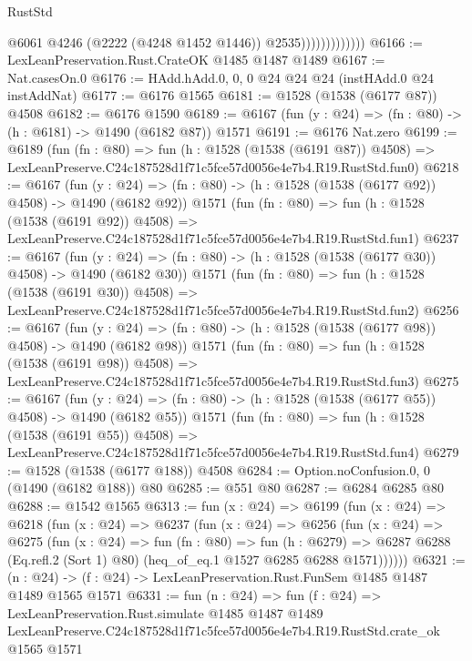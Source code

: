 \begin{lexlean}{RustStd}
\begin{coremodule}
                              @6061
                              @4246
                              (@2222 (@4248 @1452 @1446))
                              @2535)))))))))))))
@6166 := LexLeanPreservation.Rust.CrateOK @1485 @1487 @1489
@6167 := Nat.casesOn.{0}
@6176 := HAdd.hAdd.{0, 0, 0} @24 @24 @24 (instHAdd.{0} @24 instAddNat)
@6177 := @6176 @1565
@6181 := @1528 (@1538 (@6177 @87)) @4508
@6182 := @6176 @1590
@6189 := @6167 (fun (y : @24) => (fn : @80) -> (h : @6181) -> @1490 (@6182 @87)) @1571
@6191 := @6176 Nat.zero
@6199 := @6189
    (fun (fn : @80) =>
    fun (h : @1528 (@1538 (@6191 @87)) @4508) =>
    LexLeanPreserve.C24c187528d1f71c5fce57d0056e4e7b4.R19.RustStd.fun0)
@6218 := @6167
    (fun (y : @24) => (fn : @80) -> (h : @1528 (@1538 (@6177 @92)) @4508) -> @1490 (@6182 @92))
    @1571
    (fun (fn : @80) =>
    fun (h : @1528 (@1538 (@6191 @92)) @4508) =>
    LexLeanPreserve.C24c187528d1f71c5fce57d0056e4e7b4.R19.RustStd.fun1)
@6237 := @6167
    (fun (y : @24) => (fn : @80) -> (h : @1528 (@1538 (@6177 @30)) @4508) -> @1490 (@6182 @30))
    @1571
    (fun (fn : @80) =>
    fun (h : @1528 (@1538 (@6191 @30)) @4508) =>
    LexLeanPreserve.C24c187528d1f71c5fce57d0056e4e7b4.R19.RustStd.fun2)
@6256 := @6167
    (fun (y : @24) => (fn : @80) -> (h : @1528 (@1538 (@6177 @98)) @4508) -> @1490 (@6182 @98))
    @1571
    (fun (fn : @80) =>
    fun (h : @1528 (@1538 (@6191 @98)) @4508) =>
    LexLeanPreserve.C24c187528d1f71c5fce57d0056e4e7b4.R19.RustStd.fun3)
@6275 := @6167
    (fun (y : @24) => (fn : @80) -> (h : @1528 (@1538 (@6177 @55)) @4508) -> @1490 (@6182 @55))
    @1571
    (fun (fn : @80) =>
    fun (h : @1528 (@1538 (@6191 @55)) @4508) =>
    LexLeanPreserve.C24c187528d1f71c5fce57d0056e4e7b4.R19.RustStd.fun4)
@6279 := @1528 (@1538 (@6177 @188)) @4508
@6284 := Option.noConfusion.{0, 0} (@1490 (@6182 @188)) @80
@6285 := @551 @80
@6287 := @6284 @6285 @80
@6288 := @1542 @1565
@6313 := fun (x : @24) =>
  @6199
    (fun (x : @24) =>
    @6218
      (fun (x : @24) =>
      @6237
        (fun (x : @24) =>
        @6256
          (fun (x : @24) =>
          @6275
            (fun (x : @24) =>
            fun (fn : @80) =>
            fun (h : @6279) =>
            @6287 @6288 (Eq.refl.{2} (Sort 1) @80) (heq_of_eq.{1} @1527 @6285 @6288 @1571))))))
@6321 := (n : @24) -> (f : @24) -> LexLeanPreservation.Rust.FunSem @1485 @1487 @1489 @1565 @1571
@6331 := fun (n : @24) =>
  fun (f : @24) =>
  LexLeanPreservation.Rust.simulate
    @1485
    @1487
    @1489
    LexLeanPreserve.C24c187528d1f71c5fce57d0056e4e7b4.R19.RustStd.crate_ok
    @1565
    @1571
\end{coremodule}
\end{lexlean}
